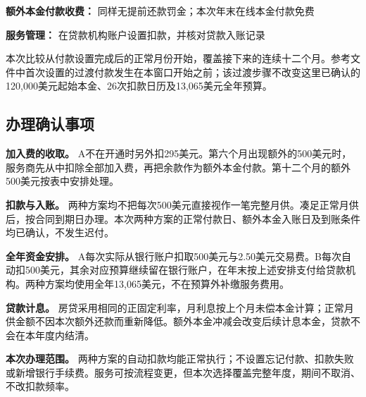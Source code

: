 \documentclass[UTF8,fontset=none,11pt,a4paper]{ctexart}
\begin{document}
\textbf{额外本金付款收费：} 同样无提前还款罚金；本次年末在线本金付款免费


\textbf{服务管理：} 在贷款机构账户设置扣款，并核对贷款入账记录


本次比较从付款设置完成后的正常月份开始，覆盖接下来的连续十二个月。参考文件中首次设置的过渡付款发生在本窗口开始之前；该过渡步骤不改变这里已确认的120,000美元起始本金、26次扣款日历及13,065美元全年预算。


\subsection*{办理确认事项}
\textbf{加入费的收取。} A不在开通时另外扣295美元。第六个月出现额外的500美元时，服务商先从中扣除全部加入费，再把余款作为额外本金付款。第十二个月的额外500美元按表中安排处理。


\textbf{扣款与入账。} 两种方案均不把每次500美元直接视作一笔完整月供。凑足正常月供后，按合同到期日办理。本次两种方案的正常付款日、额外本金入账日及到账条件均已确认，不发生迟付。


\textbf{全年资金安排。} A每次实际从银行账户扣取500美元与2.50美元交易费。B每次自动扣500美元，其余对应预算继续留在银行账户，在年末按上述安排支付给贷款机构。两种方案均使用全年13,065美元，不在预算外补缴服务费用。


\textbf{贷款计息。} 房贷采用相同的正固定利率，月利息按上个月未偿本金计算；正常月供金额不因本次额外还款而重新降低。额外本金冲减会改变后续计息本金，贷款不会在本年度内结清。


\textbf{本次办理范围。} 两种方案的自动扣款均能正常执行；不设置忘记付款、扣款失败或新增银行手续费。服务可按流程变更，但本次选择覆盖完整年度，期间不取消、不改扣款频率。
\end{document}
